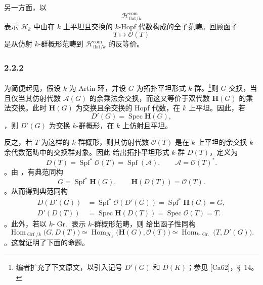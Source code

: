另一方面，以 \[
  \mathcal H^{\mathrm{com}}_{\mathrm{flat}/k}
\] 表示 \(\mathcal H_k\) 中由在 \(k\) 上平坦且交换的 \(k\)-Hopf 代数构成的全子范畴。回顾函子 \[
  T\longmapsto\mathcal O(T)
\] 是从仿射 \(k\)-群概形范畴到 \(\mathcal H^{\mathrm{com}}_{\mathrm{flat}/k}\) 的反等价。

\subsubsection*{2.2.2}
\label{sga3:VIIB:2.2.2}

为简便起见，假设 \(k\) 为 Artin 环，并设 \(G\) 为拓扑平坦形式 \(k\)-群。\footnote{\label{sga3:VIIB:nde:83}编者扩充了下文原文，以引入记号 \(D'(G)\) 和 \(D(K)\)；参见 [Ca62]，\S~14。}则 \(G\) 交换，当且仅当其仿射代数 \(\mathcal A(G)\) 的余乘法余交换，而这又等价于双代数 \(\mathbf H(G)\) 的乘法交换。此时 \(\mathbf H(G)\) 为交换且余交换的 Hopf 代数，在 \(k\) 上平坦。因此，若 \[
  D'(G)=\operatorname{Spec}\mathbf H(G),
\]，则 \(D'(G)\) 为交换 \(k\)-群概形，在 \(k\) 上仿射且平坦。

反之，若 \(T\) 为这样的 \(k\)-群概形，则其仿射代数 \(\mathcal O(T)\) 是在 \(k\) 上平坦的余交换 \(k\)-余代数范畴中的交换群对象。因此  给出拓扑平坦形式 \(k\)-群 \(D(T)\)，定义为 \[
  D(T)
  =
  \operatorname{Spf}^*\mathcal O(T)
  =
  \operatorname{Spf}(\mathcal A),
  \qquad
  \mathcal A=\mathcal O(T)^*.
\]。由 ，有典范同构 \[
  G=\operatorname{Spf}^*\mathbf H(G),
  \qquad
  \mathbf H(D(T))=\mathcal O(T).
\]。从而得到典范同构 \[
\begin{aligned}
  D(D'(G))
  &=
  \operatorname{Spf}^*\mathcal O(D'(G))
  =
  \operatorname{Spf}^*\mathbf H(G)
  =
  G,
  \\
  D'(D(T))
  &=
  \operatorname{Spec}\mathbf H(D(T))
  =
  \operatorname{Spec}\mathcal O(T)
  =
  T.
\end{aligned}
\]。此外，若以 \(k\text{-}\operatorname{Gr.}\) 表示 \(k\)-群概形范畴，则  给出函子性同构 \[
  \operatorname{Hom}_{\operatorname{Grf}/k}\bigl(G,D(T)\bigr)
  \simeq
  \operatorname{Hom}_{\mathcal H_k}
    \bigl(\mathbf H(G),\mathcal O(T)\bigr)
  \simeq
  \operatorname{Hom}_{k\text{-}\operatorname{Gr.}}
    \bigl(T,D'(G)\bigr).
\]。这就证明了下面的命题。

